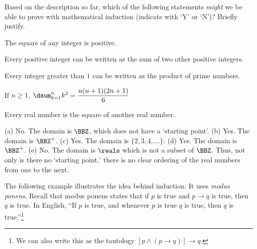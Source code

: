 \begin{exer}
Based on the description so far, which of the following
statements {\em might} we be able to prove with mathematical induction (indicate with `Y' or `N')?
Briefly justify.
\begin{lenum}
\itemtf
The square of any integer is positive.

\vspace*{.125in}
\itemtf
Every positive integer can be written as the sum of two other
positive integers.

\vspace*{.125in}
\itemtf
Every integer greater than $1$ can be written as the product of
prime numbers.

\vspace*{.125in}
\itemtf
If $n\geq 1$, 
$\dsum _{k=1}^n k^2 = \dfrac{n(n+1)(2n+1)}{6}$

\vspace*{.125in}
\itemtf
Every real number is the square of another real number.

\end{lenum}

\vspace*{.25in} %
\begin{answer}
(a) No.  The domain is $\BBZ$, which does not have a `starting point'.
(b) Yes.  The domain is $\BBZ^+$.
(c) Yes.  The domain is $\{2,3,4,\ldots\}$.
(d) Yes.  The domain is $\BBZ^+$.
(e) No.  
The domain is $\reals$ which is not a subset of $\BBZ$.  
Thus, not only is there no `starting point,'
there is no clear ordering of the real numbers from one to the next.
\end{answer}
\end{exer}

The following example illustrates the idea behind induction.
It uses {\em modus ponens}.
Recall that modus ponens states that 
if $p$ is true and $p\rightarrow q$ is true, then $q$ is true.  In English, 
``If $p$ is true, and whenever $p$ is true $q$ is true, then $q$ is true.''\footnote{We can also write
this as the tautology $[p\wedge(p\rightarrow q)]\rightarrow q$.}

